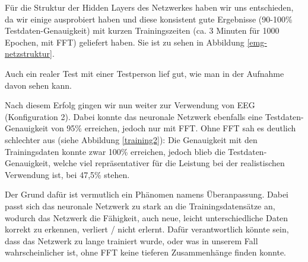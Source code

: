 \documentclass[11pt]{scrartcl}
\begin{document}
	Für die Struktur der Hidden Layers des Netzwerkes haben wir uns entschieden, da wir einige ausprobiert haben und diese konsistent gute Ergebnisse (90-100\% Testdaten-Genauigkeit) mit kurzen Trainingszeiten (ca. 3 Minuten für 1000 Epochen, mit FFT) geliefert haben. Sie ist zu sehen in Abbildung \ref{emg-netzstruktur}.

	\begin{figure}[H]
	\end{figure}

	Auch ein realer Test mit einer Testperson lief gut, wie man in der Aufnahme davon sehen kann. \cite{projekt-video}

	Nach diesem Erfolg gingen wir nun weiter zur Verwendung von EEG (Konfiguration 2). Dabei konnte das neuronale Netzwerk ebenfalls eine Testdaten-Genauigkeit von 95\% erreichen, jedoch nur mit FFT. Ohne FFT sah es deutlich schlechter aus (siehe Abbildung \ref{training2}): Die Genauigkeit mit den Trainingsdaten konnte zwar 100\% erreichen, jedoch blieb die Testdaten-Genauigkeit, welche viel repräsentativer für die Leistung bei der realistischen Verwendung ist, bei 47,5\% stehen.

	Der Grund dafür ist vermutlich ein Phänomen namens Überanpassung. Dabei passt sich das neuronale Netzwerk zu stark an die Trainingsdatensätze an, wodurch das Netzwerk die Fähigkeit, auch neue, leicht unterschiedliche Daten korrekt zu erkennen, verliert / nicht erlernt. Dafür verantwortlich könnte sein, dass das Netzwerk zu lange trainiert wurde, oder was in unserem Fall wahrscheinlicher ist, ohne FFT keine tieferen Zusammenhänge finden konnte.
\end{document}
